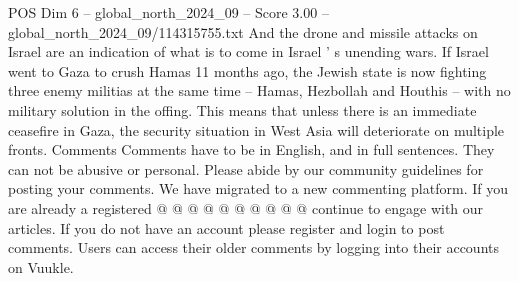 \begin{textsample}{POS Dim 6 – global\_north\_2024\_09 – Score 3.00 – global\_north\_2024\_09/114315755.txt}
And the drone and missile attacks on Israel are an indication of what is to come in Israel ' s unending wars.
If Israel went to Gaza to crush Hamas 11 months ago, the Jewish state is now fighting three enemy militias at the same time -- Hamas, Hezbollah and Houthis -- with no military solution in the offing.
This means that unless there is an immediate ceasefire in Gaza, the security situation in West Asia will deteriorate on multiple fronts.
Comments Comments have to be in English, and in full sentences.
They can not be abusive or personal.
Please abide by our community guidelines for posting your comments.
We have migrated to a new commenting platform.
If you are already a registered @ @ @ @ @ @ @ @ @ @ continue to engage with our articles.
If you do not have an account please register and login to post comments.
Users can access their older comments by logging into their accounts on Vuukle.

\end{textsample}
